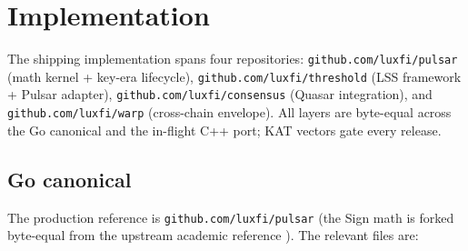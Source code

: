 \section{Implementation}
\label{sec:implementation}

The shipping implementation spans four repositories: \texttt{github.com/luxfi/pulsar} (math kernel + key-era lifecycle), \texttt{github.com/luxfi/threshold} (LSS framework + Pulsar adapter), \texttt{github.com/luxfi/consensus} (Quasar integration), and \texttt{github.com/luxfi/warp} (cross-chain envelope). All layers are byte-equal across the Go canonical and the in-flight C++ port; KAT vectors gate every release.

\subsection{Go canonical}

The production reference is \texttt{github.com/luxfi/pulsar} \cite{pulsar} (the Sign math is forked byte-equal from the upstream academic reference \cite{ringtail}). The relevant files are:

